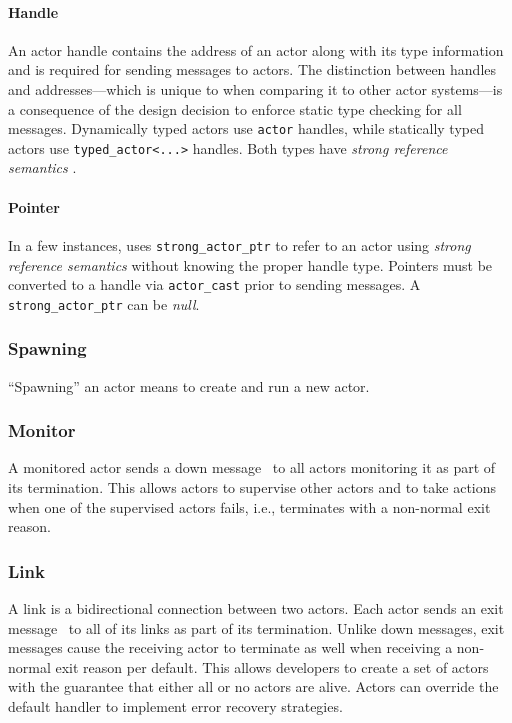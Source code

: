 \paragraph{Handle}
\label{actor-handle}

An actor handle contains the address of an actor along with its type information and is required for sending messages to actors. The distinction between handles and addresses---which is unique to \lib when comparing it to other actor systems---is a consequence of the design decision to enforce static type checking for all messages. Dynamically typed actors use \lstinline^actor^ handles, while statically typed actors use \lstinline^typed_actor<...>^ handles. Both types have \emph{strong reference semantics} .

\paragraph{Pointer}
\label{actor-pointer}

In a few instances, \lib uses \lstinline^strong_actor_ptr^ to refer to an actor using \emph{strong reference semantics}  without knowing the proper handle type. Pointers must be converted to a handle via \lstinline^actor_cast^  prior to sending messages. A \lstinline^strong_actor_ptr^ can be \emph{null}.

\subsubsection{Spawning}

``Spawning'' an actor means to create and run a new actor.

\subsubsection{Monitor}
\label{monitor}

A monitored actor sends a down message~ to all actors monitoring it as part of its termination.
This allows actors to supervise other actors and to take actions when one of the supervised actors fails, i.e., terminates with a non-normal exit reason.

\subsubsection{Link}
\label{link}

A link is a bidirectional connection between two actors.
Each actor sends an exit message~ to all of its links as part of its termination.
Unlike down messages, exit messages cause the receiving actor to terminate as well when receiving a non-normal exit reason per default.
This allows developers to create a set of actors with the guarantee that either all or no actors are alive.
Actors can override the default handler to implement error recovery strategies.

